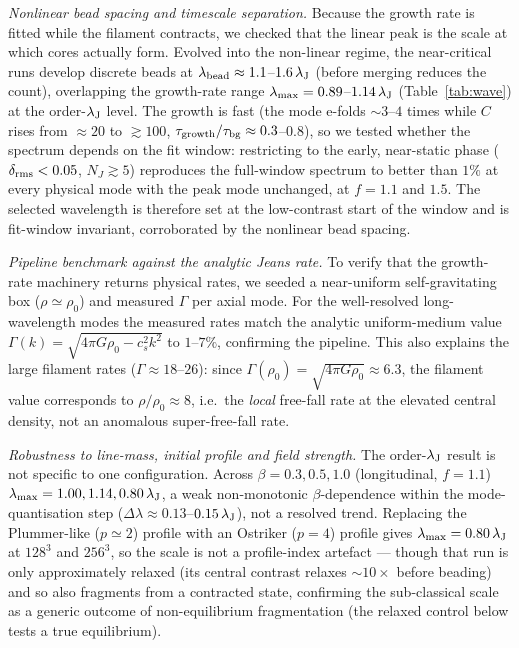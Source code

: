 \documentclass[usenatbib,twoside,twocolumn]{mnras}
\begin{document}
\emph{Nonlinear bead spacing and timescale separation.} Because the growth rate is fitted while the filament contracts, we checked that the linear peak is the scale at which cores actually form. Evolved into the non-linear regime, the near-critical runs develop discrete beads at $\lambda_{\rm bead}\approx1.1$--$1.6\,\lambda_{\rm J}$ (before merging reduces the count), overlapping the growth-rate range $\lambda_{\rm max}=0.89$--$1.14\,\lambda_{\rm J}$ (Table~\ref{tab:wave}) at the order-$\lambda_{\rm J}$ level. The growth is fast (the mode e-folds $\sim3$--$4$ times while $C$ rises from $\approx20$ to $\gtrsim100$, $\tau_{\rm growth}/\tau_{\rm bg}\approx0.3$--$0.8$), so we tested whether the spectrum depends on the fit window: restricting to the early, near-static phase ($\delta_{\rm rms}<0.05$, $N_J\gtrsim5$) reproduces the full-window spectrum to better than $1\%$ at every physical mode with the peak mode unchanged, at $f=1.1$ and $1.5$. The selected wavelength is therefore set at the low-contrast start of the window and is fit-window invariant, corroborated by the nonlinear bead spacing.

\emph{Pipeline benchmark against the analytic Jeans rate.} To verify that the growth-rate machinery returns physical rates, we seeded a near-uniform self-gravitating box ($\rho\simeq\rho_0$) and measured $\Gamma$ per axial mode. For the well-resolved long-wavelength modes the measured rates match the analytic uniform-medium value $\Gamma(k)=\sqrt{4\pi G\rho_0-c_s^2k^2}$ to $1$--$7\%$, confirming the pipeline. This also explains the large filament rates ($\Gamma\approx18$--$26$): since $\Gamma(\rho_0)=\sqrt{4\pi G\rho_0}\approx6.3$, the filament value corresponds to $\rho/\rho_0\approx8$, i.e.\ the \emph{local} free-fall rate at the elevated central density, not an anomalous super-free-fall rate.

\emph{Robustness to line-mass, initial profile and field strength.} The order-$\lambda_{\rm J}$ result is not specific to one configuration. Across $\beta=0.3,0.5,1.0$ (longitudinal, $f=1.1$) $\lambda_{\rm max}=1.00,1.14,0.80\,\lambda_{\rm J}$, a weak non-monotonic $\beta$-dependence within the mode-quantisation step ($\Delta\lambda\approx0.13$--$0.15\,\lambda_{\rm J}$), not a resolved trend. Replacing the Plummer-like ($p\simeq2$) profile with an Ostriker ($p=4$) profile gives $\lambda_{\rm max}=0.80\,\lambda_{\rm J}$ at $128^3$ and $256^3$, so the scale is not a profile-index artefact --- though that run is only approximately relaxed (its central contrast relaxes $\sim10\times$ before beading) and so also fragments from a contracted state, confirming the sub-classical scale as a generic outcome of non-equilibrium fragmentation (the relaxed control below tests a true equilibrium).
\end{document}
